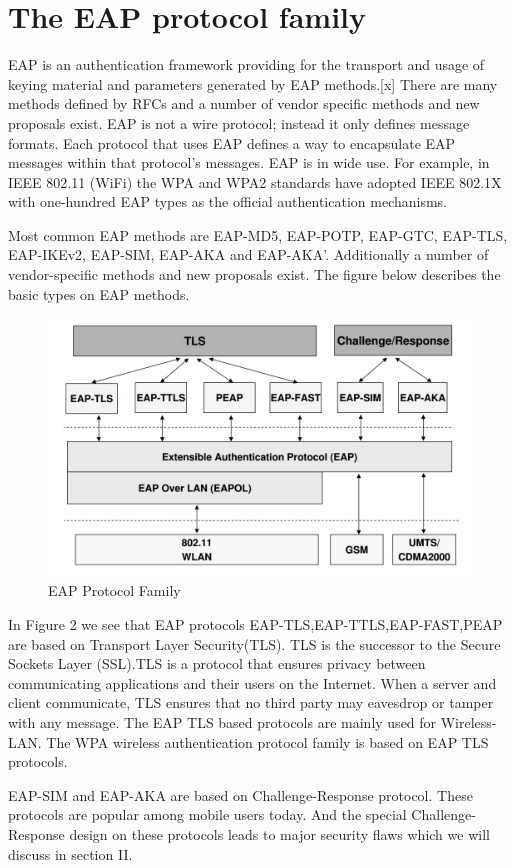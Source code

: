 \section{The EAP protocol family}

EAP is an authentication framework providing for the transport and usage of keying material and parameters generated by EAP methods.[x] There are many methods defined by RFCs and a number of vendor specific methods and new proposals exist. EAP is not a wire protocol; instead it only defines message formats. Each protocol that uses EAP defines a way to encapsulate EAP messages within that protocol's messages. EAP is in wide use. For example, in IEEE 802.11 (WiFi) the WPA and WPA2 standards have adopted IEEE 802.1X with one-hundred EAP types as the official authentication mechanisms.

Most common EAP methods are EAP-MD5, EAP-POTP, EAP-GTC, EAP-TLS, EAP-IKEv2, EAP-SIM, EAP-AKA and EAP-AKA'. Additionally a number of vendor-specific methods and new proposals exist. The figure below describes the basic types on EAP methods. 

\begin{figure}[htb]
\centering	
\includegraphics[width=1\textwidth]{images/eap_protocol_family.jpg}
\caption{EAP Protocol Family} 
\label{fig:EAP Protocol Family}
\end{figure}

In Figure 2 we see that EAP protocols EAP-TLS,EAP-TTLS,EAP-FAST,PEAP are based on Transport Layer Security(TLS).  TLS is the successor to the Secure Sockets Layer (SSL).TLS is a protocol that ensures privacy between communicating applications and their users on the Internet. When a server and client communicate, TLS ensures that no third party may eavesdrop or tamper with any message. The EAP TLS based protocols are mainly used for Wireless-LAN. The WPA wireless authentication protocol family is based on EAP TLS protocols. 

EAP-SIM and EAP-AKA are based on Challenge-Response protocol. These protocols are popular among mobile users today. And the special Challenge-Response design on these protocols leads to major security flaws which we will discuss in section II. 